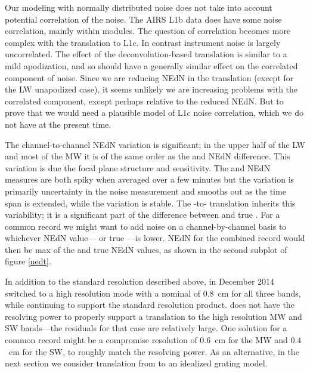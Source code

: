 \documentclass[journal]{IEEEtran}
\begin{document}
Our modeling with normally distributed noise does not take into
account potential correlation of the {\airs} noise.  The AIRS L1b
data does have some noise correlation, mainly within modules.  The
question of correlation becomes more complex with the translation to
L1c.  In contrast {\cris} instrument noise is largely uncorrelated.
The effect of the deconvolution-based translation is similar to a
mild apodization, and so should have a generally similar effect on
the correlated component of {\airs} noise.  Since we are reducing
NEdN in the translation (except for the LW unapodized case), it
seems unlikely we are increasing problems with the correlated
component, except perhaps relative to the reduced NEdN.  But to
prove that we would need a plausible model of L1c noise correlation,
which we do not have at the present time.


The {\airs} channel-to-channel NEdN variation is significant; in the
upper half of the LW and most of the MW it is of the same order as
the {\airs} and {\cris} NEdN difference.  This variation is due the
{\airs} focal plane structure and sensitivity.  The {\airs} and
{\cris} NEdN measures are both spiky when averaged over a few
minutes but the {\cris} variation is primarily uncertainty in the
noise measurement and smooths out as the time span is extended,
while the {\airs} variation is stable.  The {\airs}-to-{\cris}
translation inherits this variability; it is a significant part of
the difference between {\airs} {\cris} and true {\cris}.  For a
common record we might want to add noise on a channel-by-channel
basis to whichever NEdN value---{\airs} {\cris} or true {\cris}---is
lower.  NEdN for the combined record would then be max of the
{\airs} {\cris} and true {\cris} NEdN values, as shown in the second
subplot of figure \ref{nedt}.

In addition to the standard resolution described above, in December
2014 {\cris} switched to a high resolution mode with a nominal
{\opd} of $0.8$~cm for all three bands, while continuing to support
the standard resolution product.  {\airs} does not have the
resolving power to properly support a translation to the {\cris}
high resolution MW and SW bands---the residuals for that case are
relatively large.  One solution for a common record might be a
compromise {\cris} resolution of $0.6$~cm for the MW and $0.4$~cm
for the SW, to roughly match the {\airs} resolving power.  As an
alternative, in the next section we consider translation from
{\airs} to an idealized grating model.
\end{document}
